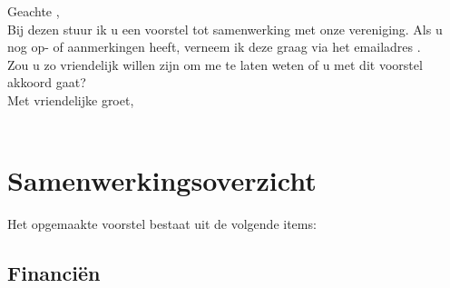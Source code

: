 \documentclass[
 digital,         %
]{GEWISLetter}
\newcommand{\GEWIScontact}{%
\\%
}
\begin{document}
\GEWISfirstpage                 %
\printadresenkenmerk            %

Geachte %
,\\[2\baselineskip]
Bij dezen stuur ik u een voorstel tot samenwerking met onze vereniging. Als u nog op- of aanmerkingen heeft, verneem ik deze graag via het emailadres \href{mailto:%
}{%
}.\\[\baselineskip]
Zou u zo vriendelijk willen zijn om me te laten weten of u met dit voorstel akkoord gaat?\\[2\baselineskip]

Met vriendelijke groet,\\[2\baselineskip]
\GEWIScontact

\section{Samenwerkingsoverzicht}
Het opgemaakte voorstel bestaat uit de volgende items:
 \begin{itemize}
 \end{itemize}
\subsection{Financi\"en}




\end{document}
